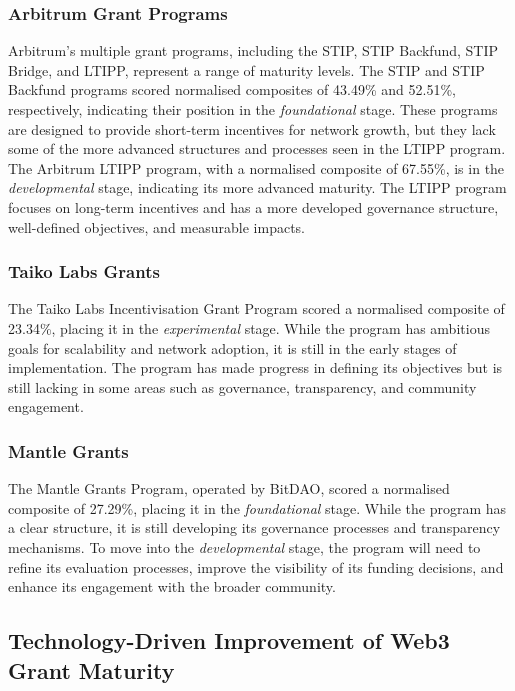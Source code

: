 \documentclass[conference]{IEEEtran}
\begin{document}
\subsubsection{Arbitrum Grant Programs}\label{sec_4.2.2}
Arbitrum’s multiple grant programs, including the STIP, STIP Backfund, STIP Bridge, and LTIPP, represent a range of maturity levels. The STIP and STIP Backfund programs scored normalised composites of 43.49\% and 52.51\%, respectively, indicating their position in the \textit{foundational} stage. These programs are designed to provide short-term incentives for network growth, but they lack some of the more advanced structures and processes seen in the LTIPP program. The Arbitrum LTIPP program, with a normalised composite of 67.55\%, is in the \textit{developmental} stage, indicating its more advanced maturity. The LTIPP program focuses on long-term incentives and has a more developed governance structure, well-defined objectives, and measurable impacts.

\subsubsection{Taiko Labs Grants}\label{sec_4.2.3}
The Taiko Labs Incentivisation Grant Program scored a normalised composite of 23.34\%, placing it in the \textit{experimental} stage. While the program has ambitious goals for scalability and network adoption, it is still in the early stages of implementation. The program has made progress in defining its objectives but is still lacking in some areas such as governance, transparency, and community engagement.

\subsubsection{Mantle Grants}\label{sec_4.2.4}
The Mantle Grants Program, operated by BitDAO, scored a normalised composite of 27.29\%, placing it in the \textit{foundational} stage. While the program has a clear structure, it is still developing its governance processes and transparency mechanisms. To move into the \textit{developmental} stage, the program will need to refine its evaluation processes, improve the visibility of its funding decisions, and enhance its engagement with the broader community.


\subsection{Technology-Driven Improvement of Web3 Grant Maturity}\label{sec_4.3}
\end{document}
